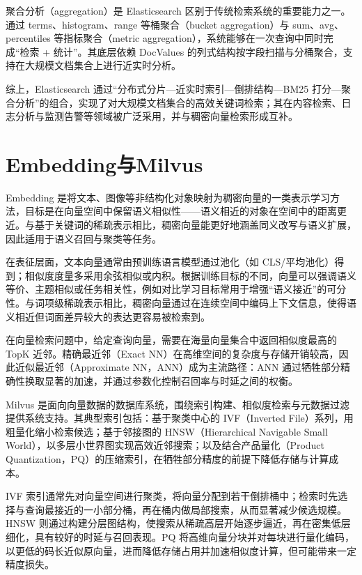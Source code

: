 聚合分析（aggregation）是 Elasticsearch 区别于传统检索系统的重要能力之一。通过 terms、histogram、range 等桶聚合（bucket aggregation）与 sum、avg、percentiles 等指标聚合（metric aggregation），系统能够在一次查询中同时完成“检索 + 统计”。其底层依赖 DocValues 的列式结构按字段扫描与分桶聚合，支持在大规模文档集合上进行近实时分析。

综上，Elasticsearch 通过“分布式分片—近实时索引—倒排结构—BM25 打分—聚合分析”的组合，实现了对大规模文档集合的高效关键词检索；其在内容检索、日志分析与监测告警等领域被广泛采用，并与稠密向量检索形成互补\cite{wang2021bert}。

\section{Embedding与Milvus}

Embedding 是将文本、图像等非结构化对象映射为稠密向量的一类表示学习方法，目标是在向量空间中保留语义相似性——语义相近的对象在空间中的距离更近。与基于关键词的稀疏表示相比，稠密向量能更好地涵盖同义改写与语义扩展，因此适用于语义召回与聚类等任务。

在表征层面，文本向量通常由预训练语言模型通过池化（如 CLS/平均池化）得到；相似度度量多采用余弦相似或内积。根据训练目标的不同，向量可以强调语义等价、主题相似或任务相关性，例如对比学习目标常用于增强“语义接近”的可分性。与词项级稀疏表示相比，稠密向量通过在连续空间中编码上下文信息，使得语义相近但词面差异较大的表达更容易被检索到。

在向量检索问题中，给定查询向量，需要在海量向量集合中返回相似度最高的 TopK 近邻。精确最近邻（Exact NN）在高维空间的复杂度与存储开销较高，因此近似最近邻（Approximate NN，ANN）成为主流路径：ANN 通过牺牲部分精确性换取显著的加速，并通过参数化控制召回率与时延之间的权衡。

Milvus 是面向向量数据的数据库系统，围绕索引构建、相似度检索与元数据过滤提供系统支持\cite{wang2021milvus}。其典型索引包括：基于聚类中心的 IVF（Inverted File）系列，用粗量化缩小检索候选；基于邻接图的 HNSW（Hierarchical Navigable Small World），以多层小世界图实现高效近邻搜索；以及结合产品量化（Product Quantization，PQ）的压缩索引，在牺牲部分精度的前提下降低存储与计算成本。

IVF 索引通常先对向量空间进行聚类，将向量分配到若干倒排桶中；检索时先选择与查询最接近的一小部分桶，再在桶内做局部搜索，从而显著减少候选规模。HNSW 则通过构建分层图结构，使搜索从稀疏高层开始逐步逼近，再在密集低层细化，具有较好的时延与召回表现。PQ 将高维向量分块并对每块进行量化编码，以更低的码长近似原向量，进而降低存储占用并加速相似度计算，但可能带来一定精度损失。

